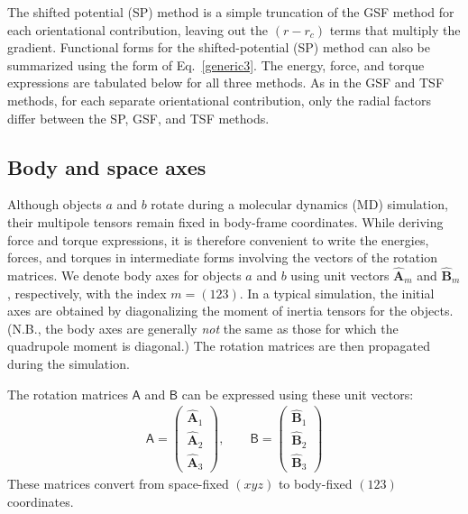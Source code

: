 The shifted potential (SP) method is a simple truncation of the GSF
method for each orientational contribution, leaving out the $(r-r_c)$
terms that multiply the gradient. Functional forms for the
shifted-potential (SP) method can also be summarized using the form of
Eq.~\ref{generic3}.  The energy, force, and torque expressions are
tabulated below for all three methods. As in the GSF and TSF methods,
for each separate orientational contribution, only the radial factors
differ between the SP, GSF, and TSF methods.


\subsection{\label{sec:level2}Body and space axes}
Although objects $a$ and $b$ rotate during a molecular
dynamics (MD) simulation, their multipole tensors remain fixed in
body-frame coordinates. While deriving force and torque expressions,
it is therefore convenient to write the energies, forces, and torques
in intermediate forms involving the vectors of the rotation matrices.
We denote body axes for objects $a$ and $b$ using unit vectors
$\hat{\mathbf{A}}_m$ and $\hat{\mathbf{B}}_m$, respectively, with the index $m=(123)$.
In a typical simulation, the initial axes are obtained by
diagonalizing the moment of inertia tensors for the objects.  (N.B.,
the body axes are generally {\it not} the same as those for which the
quadrupole moment is diagonal.)  The rotation matrices are then
propagated during the simulation.

The rotation matrices $\mathsf {A}$ and $\mathsf {B}$ can be
expressed using these unit vectors:
\begin{eqnarray}
\mathsf {A} = 
\begin{pmatrix}
\hat{\mathbf{A}}_1 \\
\hat{\mathbf{A}}_2 \\
\hat{\mathbf{A}}_3
\end{pmatrix}, \qquad
\mathsf {B} = 
\begin{pmatrix}
\hat{\mathbf{B}}_1 \\
\hat{\mathbf{B}}_2 \\
\hat{\mathbf{B}}_3
\end{pmatrix}
\end{eqnarray}
%
These matrices convert from space-fixed $(xyz)$ to body-fixed $(123)$
coordinates.

